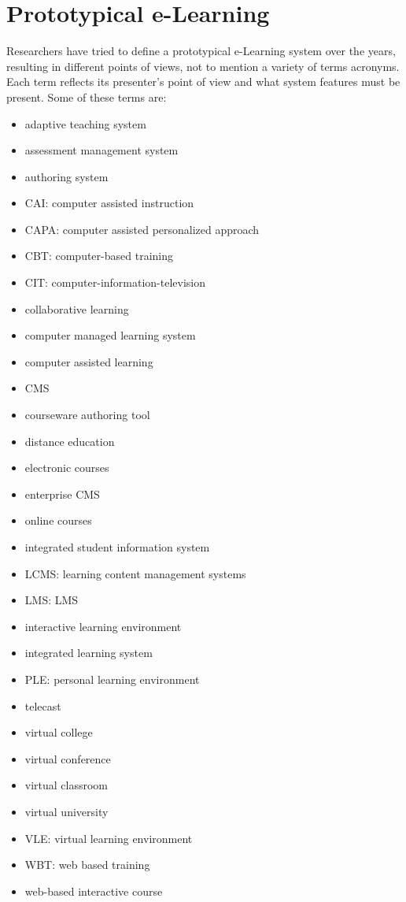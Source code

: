 \documentclass[12pt,a4paper,final,twoside,onecolumn,titlepage]{book}
\begin{document}
\section{Prototypical e-Learning}
Researchers have tried to define a prototypical e-Learning system over the years, resulting in different points of views, not to mention a variety of terms acronyms. Each term reflects its presenter's point of view and what system features must be present. Some of these terms are:
\begin{itemize}
\item adaptive teaching system \cite{UMIS41}
\item assessment management system \cite{UMIS50}
\item authoring system \cite{UMIS03}
\item CAI: computer assisted instruction \cite{UMIS21, UMIS24}
\item CAPA: computer assisted personalized approach \cite{UMIS51}
\item CBT: computer-based training
\item CIT: computer-information-television \cite{UMIS44}
\item collaborative learning \cite{UMIS20}
\item computer managed learning system \cite{UMIS07}
\item computer assisted learning \cite{UMIS07}
\item \gls{CMS} \cite{UMIS34}
\item courseware authoring tool \cite{UMIS02}
\item distance education \cite{UMIS09, UMIS23}
\item electronic courses \cite{UMIS28}
\item enterprise \gls{CMS} \cite{UMIS30}
\item online courses \cite{UMIS28}
\item integrated student information system \cite{UMIS56}
\item LCMS: learning content management systems \cite{UMIS53}
\item \gls{LMS}: \gls{LMS}
\item interactive learning environment \cite{UMIS17}
\item integrated learning system \cite{UMIS08}
\item PLE: personal learning environment
\item telecast \cite{UMIS27}
\item virtual college \cite{UMIS28}
\item virtual conference \cite{UMIS01}
\item virtual classroom \cite{UMIS19}
\item virtual university \cite{UMIS37}
\item VLE: virtual learning environment \cite{EV01}
\item WBT: web based training \cite{UMIS53}
\item web-based interactive course \cite{UMIS25}
\end{itemize}
\end{document}
